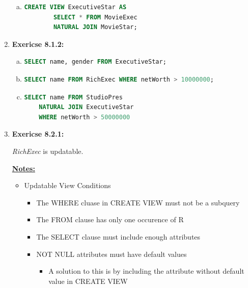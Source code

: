 \documentclass[12pt]{article}
\begin{document}
\begin{enumerate}[1.]
\begin{enumerate}[a)]
        \item

    \begin{lstlisting}[language=SQL]
    CREATE VIEW ExecutiveStar AS
        SELECT * FROM MovieExec
        NATURAL JOIN MovieStar;
    \end{lstlisting}
    \end{enumerate}

    \item \textbf{Exericse 8.1.2:}

    \begin{enumerate}[a)]
        \item

    \begin{lstlisting}[language=SQL]
    SELECT name, gender FROM ExecutiveStar;
    \end{lstlisting}

        \item

    \begin{lstlisting}[language=SQL]
    SELECT name FROM RichExec WHERE netWorth > 10000000;
    \end{lstlisting}

        \item

    \begin{lstlisting}[language=SQL]
    SELECT name FROM StudioPres
    NATURAL JOIN ExecutiveStar
    WHERE netWorth > 50000000
    \end{lstlisting}
    \end{enumerate}

    \item \textbf{Exericse 8.2.1:}

    \bigskip

    \textit{RichExec} is updatable.

    \underline{\textbf{Notes:}}

    \bigskip

    \begin{itemize}
        \item Updatable View Conditions
        \begin{itemize}
            \item The WHERE cluase in CREATE VIEW must not be a subquery
            \item The FROM clause has only one occurence of R
            \item The SELECT clause must include enough attributes
            \item NOT NULL attributes must have default values
            \begin{itemize}
                \item A solution to this is by including the attribute without
                default value in CREATE VIEW
            \end{itemize}


\end{itemize}
\end{itemize}
\end{enumerate}
\end{document}
